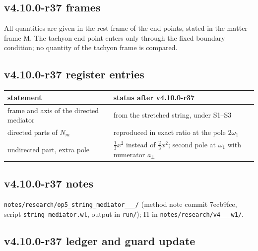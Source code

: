 \subsection*{v4.10.0-r37 frames}
\label{subsec:v4100-r37-frames}

All quantities are given in the rest frame of the end points, stated in the matter frame M.  The tachyon end point enters only through the
fixed boundary condition; no quantity of the tachyon frame is compared.

\subsection*{v4.10.0-r37 register entries}
\label{subsec:v4100-r37-register}

\begin{center}
\small
\begin{tabular}{@{}>{\raggedright\arraybackslash}p{}>{\raggedright\arraybackslash}p{}@{}}
\toprule
statement & status after v4.10.0-r37\\
\midrule
frame and axis of the directed mediator & from the stretched string, under S1--S3\\
directed parts of \(N_m\) & reproduced in exact ratio at the pole \(2\omega_1\)\\
undirected part, extra pole & \(\tfrac13x^2\) instead of \(\tfrac23x^2\); second pole at \(\omega_1\) with numerator \(a_\perp\)\\
\bottomrule
\end{tabular}
\end{center}

\subsection*{v4.10.0-r37 notes}
\label{subsec:v4100-r37-notes}

\texttt{notes/\allowbreak research/\allowbreak op5\_\allowbreak string\_\allowbreak mediator\_\_\_/} (method note commit 7ecb9fce,
script \texttt{string\_\allowbreak mediator.wl}, output in \texttt{run/}); I1 in \texttt{notes/\allowbreak research/\allowbreak v4\_\_\_\allowbreak w1/}.

\subsection*{v4.10.0-r37 ledger and guard update}
\label{subsec:v4100-r37-ledger-guard}

